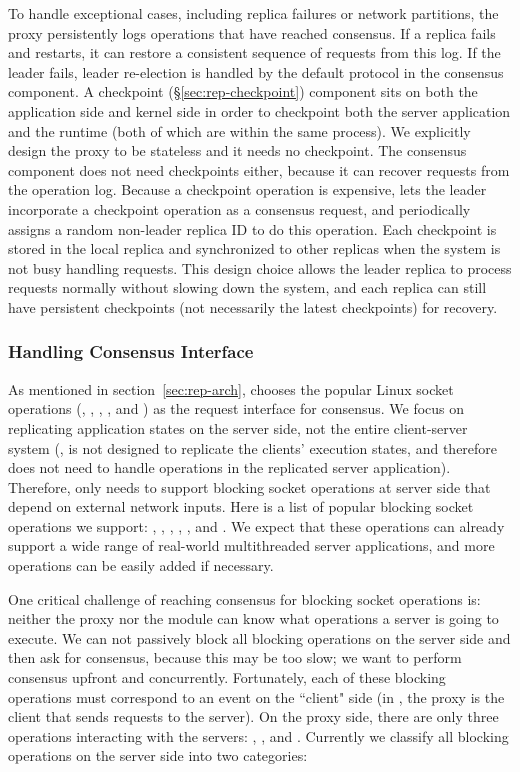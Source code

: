 To handle exceptional cases, including replica failures or network partitions,
the proxy persistently logs operations that have reached consensus. If a replica
fails and restarts, it can restore a consistent sequence of requests from this
log. If the leader fails, leader re-election is handled by the default \paxos
protocol in the consensus component. A checkpoint (\S\ref{sec:rep-checkpoint})
component sits on both the application side and kernel side in order to
checkpoint both the server application and the \smt runtime (both of which are
within the same process). We explicitly design the proxy to be stateless and it
needs no checkpoint. The consensus component does not need checkpoints either,
because it can recover requests from the operation log. Because a checkpoint
operation is expensive, \crane lets the leader incorporate a checkpoint
operation as a consensus request, and periodically assigns a random non-leader
replica ID to do this operation. Each checkpoint is stored in the local replica
and 
synchronized to other replicas when the system is not busy handling requests.
This design choice allows the leader replica to process requests normally
without slowing down the system, and each replica can still have persistent
checkpoints (not necessarily the latest checkpoints) for recovery.


\subsubsection{Handling Consensus Interface}  \label{sec:rep-api}

As mentioned in section~\ref{sec:rep-arch}, \crane chooses the popular Linux
socket operations (\eg, \connect, \accept, \send, and \recv) as the request
interface for consensus. We focus on replicating application states on the
server side, not the entire client-server system (\ie, \crane is not designed to
replicate the clients' execution states, and therefore does not need to handle
\send operations in the replicated server application). Therefore, \crane only
needs to support blocking socket operations at server side that depend on
external network inputs. Here is a list of popular blocking socket operations we
support: \recv, \sockread, \accept, \select, \poll, and \epoll. We expect that
these operations can already support a wide range of real-world multithreaded
server applications, and more operations can be easily added if necessary.

One critical challenge of reaching consensus for blocking socket operations is:
neither the proxy nor the \smt module can know what operations a server is going
to execute. We can not passively block all blocking operations on the server
side and then ask for consensus, because this may be too slow; we want to
perform consensus upfront and concurrently. Fortunately, each of these blocking
operations must correspond to an event on the ``client" side (in \crane, the
proxy is the client that sends requests to the server). On the proxy side, there
are only three operations interacting with the servers: \send, \connect, and
\close. Currently we classify all blocking operations on the server side into
two categories:

